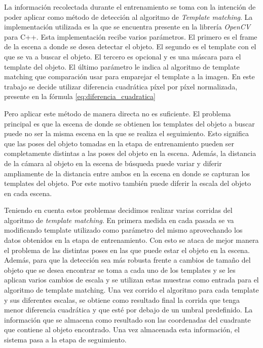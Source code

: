 
La información recolectada durante el entrenamiento se toma con la intención de poder aplicar como método de detección al algoritmo de \textit{Template matching}. La implementación utilizada es la que se encuentra presente en la librería \textit{OpenCV} para C++. Esta implementación recibe varios parámetros. El primero es el frame de la escena a donde se desea detectar el objeto. El segundo es el template con el que se va a buscar el objeto. El tercero es opcional y es una máscara para el template del objeto. El último parámetro le indica al algoritmo de template matching que comparación usar para emparejar el template a la imagen. En este trabajo se decide utilizar diferencia cuadrática píxel por píxel normalizada, presente en la fórmula \ref{eq:diferencia_cuadratica}

Pero aplicar este método de manera directa no es suficiente. El problema principal es que la escena de donde se obtienen los templates del objeto a buscar puede no ser la misma escena en la que se realiza el seguimiento. Esto significa que las poses del objeto tomadas en la etapa de entrenamiento pueden ser completamente distintas a las poses del objeto en la escena. Además, la distancia de la cámara al objeto en la escena de búsqueda puede variar y diferir ampliamente de la distancia entre ambos en la escena en donde se capturan los templates del objeto. Por este motivo también puede diferir la escala del objeto en cada escena.

Teniendo en cuenta estos problemas decidimos realizar varias corridas del algoritmo de \textit{template matching}. En primera medida en cada pasada se va modificando template utilizado como parámetro del mismo aprovechando los datos obtenidos en la etapa de entrenamiento. Con esto se ataca de mejor manera el problema de las distintas poses en las que puede estar el objeto en la escena. Además, para que la detección sea más robusta frente a cambios de tamaño del objeto que se desea encontrar se toma a cada uno de los templates y se les aplican varios cambios de escala y se utilizan estas muestras como entrada para el algoritmo de template matching. Una vez corrido el algoritmo para cada template y sus diferentes escalas, se obtiene como resultado final la corrida que tenga menor diferencia cuadrática y que esté por debajo de un umbral predefinido. La información que se almacena como resultado son las coordenadas del cuadrante que contiene al objeto encontrado. Una vez almacenada esta información, el sistema pasa a la etapa de seguimiento.

